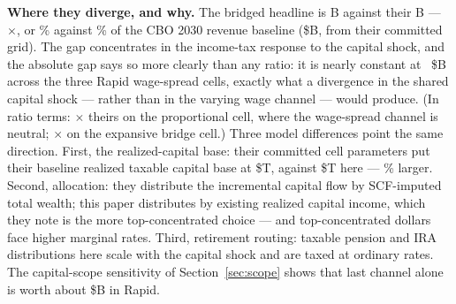 \textbf{Where they diverge, and why.} The bridged headline is
\genBridgeOursTotal B against their \genBridgeTheirsTotal B ---
\genBridgeRatio$\times$, or \genBridgeOursCboPct\% against
\genBridgeTheirsCboPct\% of the CBO 2030 revenue baseline
(\$\genTheirCBORevB B, from their committed grid). The gap concentrates in
the income-tax response to the capital shock, and the absolute gap says so
more clearly than any ratio: it is nearly constant at
\genIITGapTriplet{}~\$B across the three Rapid wage-spread cells, exactly
what a divergence in the shared capital shock --- rather than in the varying
wage channel --- would produce. (In ratio terms:
\genIITRatioProp$\times$ theirs on the proportional cell, where the
wage-spread channel is neutral; \genIITRatio$\times$ on the expansive
bridge cell.) Three model differences point the same direction. First, the
realized-capital base: their committed cell parameters put their baseline
realized taxable capital base at \$\genTheirYZeroKT T, against
\$\genModelledCapitalShareT T here --- \genBaseGapPct\% larger. Second,
allocation: they distribute the incremental capital flow by SCF-imputed
total wealth; this paper distributes by existing realized capital income,
which they note is the more top-concentrated choice --- and
top-concentrated dollars face higher marginal rates. Third, retirement
routing: taxable pension and IRA distributions here scale with the capital
shock and are taxed at ordinary rates. The capital-scope sensitivity of
Section~\ref{sec:scope} shows that last channel alone is worth about
\$\genRapidScopeDiffAbs B in Rapid.
